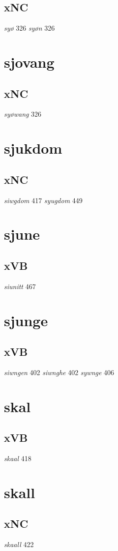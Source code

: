 \documentclass[a4paper,twocolumn]{article}
\begin{document}
\subsection{xNC}
\label{sec:org145c477}
\emph{syø} 326 \emph{syøn} 326 
\section{sjovang}
\label{sec:org5fe883d}
\subsection{xNC}
\label{sec:orge7be371}
\emph{syøwang} 326 
\section{sjukdom}
\label{sec:org39d5757}
\subsection{xNC}
\label{sec:org06c7b13}
\emph{siwgdom} 417 \emph{syugdom} 449 
\section{sjune}
\label{sec:org98a8988}
\subsection{xVB}
\label{sec:org8641b1c}
\emph{siunitt} 467 
\section{sjunge}
\label{sec:orgf345038}
\subsection{xVB}
\label{sec:org93758b9}
\emph{siwngen} 402 \emph{siwnghe} 402 \emph{sywnge} 406 
\section{skal}
\label{sec:org8e89c3d}
\subsection{xVB}
\label{sec:org29af57a}
\emph{skaal} 418 
\section{skall}
\label{sec:org0589c30}
\subsection{xNC}
\label{sec:org44a1795}
\emph{skaall} 422 
\end{document}
